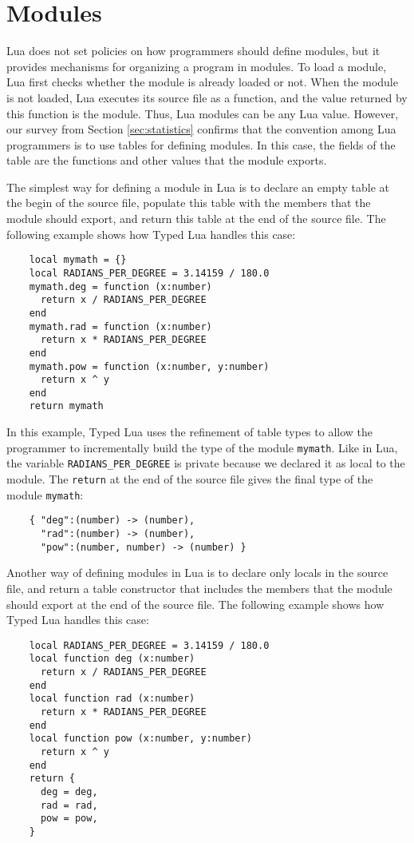 \section{Modules}
\label{sec:modules}

Lua does not set policies on how programmers should define modules,
but it provides mechanisms for organizing a program in modules.
To load a module, Lua first checks whether the module is already
loaded or not.
When the module is not loaded, Lua executes its source file as a
function, and the value returned by this function is the module.
Thus, Lua modules can be any Lua value.
However, our survey from Section \ref{sec:statistics} confirms that
the convention among Lua programmers is to use tables for defining modules. 
In this case, the fields of the table are the functions and other
values that the module exports.

The simplest way for defining a module in Lua is to declare an
empty table at the begin of the source file,
populate this table with the members that the module should export,
and return this table at the end of the source file. 
The following example shows how Typed Lua handles this case:
\begin{verbatim}
    local mymath = {}
    local RADIANS_PER_DEGREE = 3.14159 / 180.0
    mymath.deg = function (x:number)
      return x / RADIANS_PER_DEGREE
    end
    mymath.rad = function (x:number)
      return x * RADIANS_PER_DEGREE
    end
    mymath.pow = function (x:number, y:number)
      return x ^ y
    end
    return mymath
\end{verbatim}

In this example, Typed Lua uses the refinement of table types to
allow the programmer to incrementally build the type of the
module \texttt{mymath}.
Like in Lua, the variable \texttt{RADIANS\string_PER\string_DEGREE}
is private because we declared it as local to the module. 
The \texttt{return} at the end of the source file gives the
final type of the module \texttt{mymath}:
\begin{verbatim}
    { "deg":(number) -> (number),
      "rad":(number) -> (number),
      "pow":(number, number) -> (number) }
\end{verbatim}

Another way of defining modules in Lua is to declare only locals
in the source file, and return a table constructor that includes
the members that the module should export at the end of the source file.
The following example shows how Typed Lua handles this case:
\begin{verbatim}
    local RADIANS_PER_DEGREE = 3.14159 / 180.0
    local function deg (x:number)
      return x / RADIANS_PER_DEGREE
    end
    local function rad (x:number)
      return x * RADIANS_PER_DEGREE
    end
    local function pow (x:number, y:number)
      return x ^ y
    end
    return {
      deg = deg,
      rad = rad,
      pow = pow,
    }
\end{verbatim}

